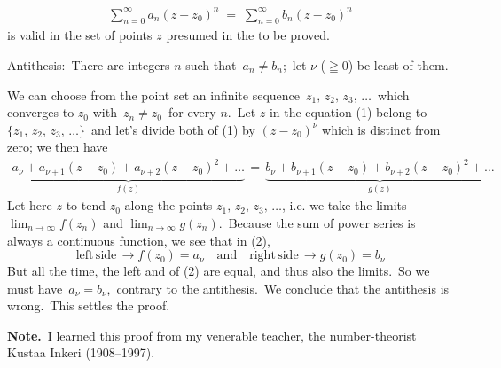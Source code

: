 \documentclass[12pt]{article}
\theoremstyle{definition}
\begin{document}
\begin{align}
\sum_{n=0}^\infty a_n(z-z_0)^n \;=\; \sum_{n=0}^\infty b_n(z-z_0)^n
\end{align}
is valid in the set of points $z$ presumed in the  to be proved.

Antithesis:\, There are integers $n$ such that\, $a_n \neq b_n$;\, let $\nu$ ($\geqq 0$) be least of them.

We can choose from the point set an infinite sequence\, $z_1,\,z_2,\,z_3,\,\ldots$\, which converges to $z_0$ with\, $z_n \neq z_0$\, for every $n$.\, Let $z$ in the equation (1) belong to\, 
$\{z_1,\,z_2,\,z_3,\,\ldots\}$\, and let's divide both  of (1) by $(z-z_0)^{\nu}$ which is distinct from zero; we then have
\begin{align}
\underbrace{a_{\nu}+a_{\nu+1}(z-z_0)+a_{\nu+2}(z-z_0)^2+\ldots}_{f(z)}\, 
=\, \underbrace{b_{\nu}+b_{\nu+1}(z-z_0)+b_{\nu+2}(z-z_0)^2+\ldots}_{g(z)}
\end{align}
Let here $z$ to tend $z_0$ along the points $z_1,\,z_2,\,z_3,\,\ldots$, i.e. we take the limits $\lim_{n\to\infty}f(z_n)$ and $\lim_{n\to\infty}g(z_n)$.\, Because the sum of power series is always a continuous function, we see that in (2),
$$\mathrm{left\,side\,}\longrightarrow f(z_0) = a_{\nu}\quad\mathrm{and}\quad
\mathrm{right\,side\,}\longrightarrow g(z_0) = b_{\nu}$$
But all the time, the left and  of (2) are equal, and thus also the limits.\, So we must have\, $a_{\nu} = b_{\nu}$,\, contrary to the antithesis.\, We conclude that the antithesis is wrong.\, This settles the proof.

\textbf{Note.}\, I learned this proof from my venerable teacher, the number-theorist Kustaa Inkeri (1908--1997).

\end{document}
